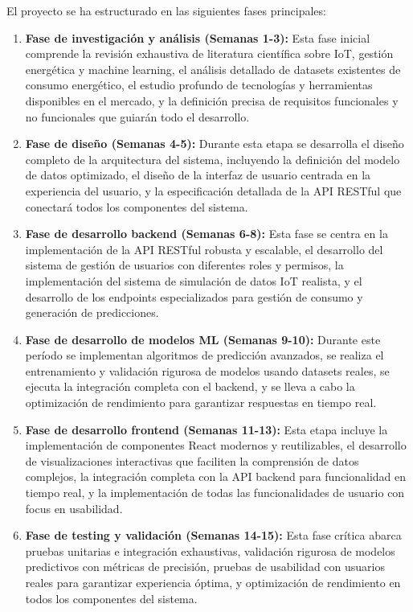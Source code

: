 El proyecto se ha estructurado en las siguientes fases principales:

\begin{enumerate}
    \item \textbf{Fase de investigación y análisis (Semanas 1-3):} Esta fase inicial comprende la revisión exhaustiva de literatura científica sobre IoT, gestión energética y machine learning, el análisis detallado de datasets existentes de consumo energético, el estudio profundo de tecnologías y herramientas disponibles en el mercado, y la definición precisa de requisitos funcionales y no funcionales que guiarán todo el desarrollo.
    
    \item \textbf{Fase de diseño (Semanas 4-5):} Durante esta etapa se desarrolla el diseño completo de la arquitectura del sistema, incluyendo la definición del modelo de datos optimizado, el diseño de la interfaz de usuario centrada en la experiencia del usuario, y la especificación detallada de la API RESTful que conectará todos los componentes del sistema.
    
    \item \textbf{Fase de desarrollo backend (Semanas 6-8):} Esta fase se centra en la implementación de la API RESTful robusta y escalable, el desarrollo del sistema de gestión de usuarios con diferentes roles y permisos, la implementación del sistema de simulación de datos IoT realista, y el desarrollo de los endpoints especializados para gestión de consumo y generación de predicciones.
    
    \item \textbf{Fase de desarrollo de modelos ML (Semanas 9-10):} Durante este período se implementan algoritmos de predicción avanzados, se realiza el entrenamiento y validación rigurosa de modelos usando datasets reales, se ejecuta la integración completa con el backend, y se lleva a cabo la optimización de rendimiento para garantizar respuestas en tiempo real.
    
    \item \textbf{Fase de desarrollo frontend (Semanas 11-13):} Esta etapa incluye la implementación de componentes React modernos y reutilizables, el desarrollo de visualizaciones interactivas que faciliten la comprensión de datos complejos, la integración completa con la API backend para funcionalidad en tiempo real, y la implementación de todas las funcionalidades de usuario con focus en usabilidad.
    
    \item \textbf{Fase de testing y validación (Semanas 14-15):} Esta fase crítica abarca pruebas unitarias e integración exhaustivas, validación rigurosa de modelos predictivos con métricas de precisión, pruebas de usabilidad con usuarios reales para garantizar experiencia óptima, y optimización de rendimiento en todos los componentes del sistema.
    

\end{enumerate}
